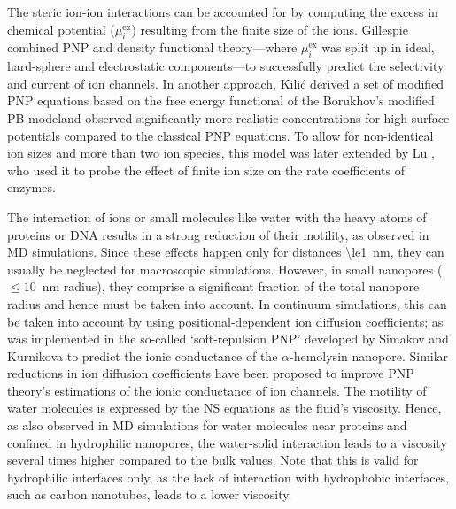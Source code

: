 \documentclass[journal=ancac3,manuscript=article,etalmode=truncate,maxauthors=0,layout=onecolumn]{achemso}
\begin{document}
The steric ion-ion interactions can be accounted for by computing the excess in chemical potential
($\mu_{i}^\text{ex}$) resulting from the finite size of the ions.\cite{Eisenberg-1996,Bazant-2009,
Daiguji-2010} Gillespie \etal{} combined PNP and density functional theory---where $\mu_{i}^\text{ex}$ was
split up in ideal, hard-sphere and electrostatic components---to successfully predict the selectivity and
current of ion channels.\cite{Gillespie-2002} In another approach, Kili\'{c} \etal{} derived a set of modified
PNP equations based on the free energy functional of the Borukhov's modified PB model\cite{Borukhov-1997}and
observed significantly more realistic concentrations for high surface potentials compared to the classical PNP
equations.\cite{Kilic-2007} To allow for non-identical ion sizes and more than two ion species, this model was
later extended by Lu \etal{}, who used it to probe the effect of finite ion size on the rate coefficients of
enzymes.\cite{Lu-2011}

The interaction of ions or small molecules like water with the heavy atoms of proteins or DNA results in a
strong reduction of their motility, as observed in MD simulations.\cite{Makarov-1998,Pronk-2014} Since these
effects happen only for distances \SI{\le1}{\nm}, they can usually be neglected for macroscopic simulations.
However, in small nanopores ($\le10$~nm radius), they comprise a significant fraction of the total nanopore
radius and hence must be taken into account.\cite{Noskov-2004,Simakov-2010,Pederson-2015,McMullen-2017} In
continuum simulations, this can be taken into account by using positional-dependent ion diffusion
coefficients; as was implemented in the so-called `soft-repulsion PNP' developed by Simakov and
Kurnikova\cite{Simakov-2010, Simakov-2018} to predict the ionic conductance of the $\alpha$-hemolysin
nanopore. Similar reductions in ion diffusion coefficients have been proposed to improve PNP theory's
estimations of the ionic conductance of ion channels.\cite{Furini-2006,Liu-2015} The motility of water
molecules is expressed by the NS equations as the fluid's viscosity. Hence, as also observed in MD simulations
for water molecules near proteins\cite{Pronk-2014} and confined in hydrophilic
nanopores,\cite{Qiao_Aluru-2003,Vo-2016,Hsu-2017} the water-solid interaction leads to a viscosity several
times higher compared to the bulk values. Note that this is valid for hydrophilic interfaces only, as the lack
of interaction with hydrophobic interfaces, such as carbon nanotubes, leads to a lower
viscosity.\cite{Ye-2011}
\end{document}
